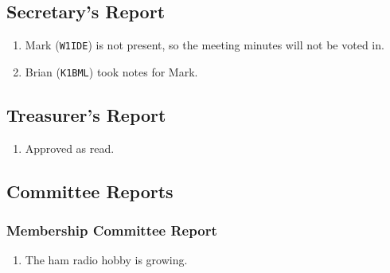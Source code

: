 \documentclass[10pt,letterpaper]{article}
\begin{document}
\subsection{Secretary's Report}
\begin{enumerate}
  \item Mark (\texttt{W1IDE}) is not present, so the meeting minutes will not be voted in.
  \item Brian (\texttt{K1BML}) took notes for Mark.
\end{enumerate}

\newpage
\subsection{Treasurer's Report}
\begin{enumerate}
  \item Approved as read.
\end{enumerate}


\subsection{Committee Reports}

\subsubsection{Membership Committee Report}
\begin{enumerate}
  \item The ham radio hobby is growing.
\end{enumerate}
\end{document}
